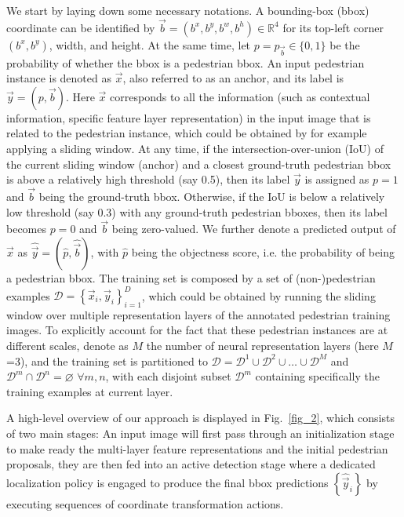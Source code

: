 \documentclass[10pt,journal,compsoc,twoside]{IEEEtran}
\begin{document}
We start by laying down some necessary notations.
A bounding-box (bbox) coordinate can be identified by $\vec{b}=(b^x,b^y,b^w,b^h) \in \mathbb{R}^4$ for its top-left corner $(b^x,b^y)$, width, and height.
At the same time, let $p=p_{\vec{b}} \in \{0, 1\}$ be the probability of whether the bbox is a pedestrian bbox.
An input pedestrian instance is denoted as $\vec{x}$, also referred to as an anchor, and its label is $\vec{y}=\left(p, \vec{b}\right)$.
Here $\vec{x}$ corresponds to all the information (such as contextual information, specific feature layer representation) in the input image that is related to the pedestrian instance,
which could be obtained by for example applying a sliding window. At any time,
if the intersection-over-union (IoU) of the current sliding window (anchor) and a closest ground-truth pedestrian bbox is above a relatively high threshold (say 0.5),
then its label $\vec{y}$ is assigned as $p=1$ and $\vec{b}$ being the ground-truth bbox.
Otherwise, if the IoU is below a relatively low threshold (say 0.3) with any ground-truth pedestrian bboxes,
then its label becomes $p=0$ and $\vec{b}$ being zero-valued.
We further denote a predicted output of $\vec{x}$ as $\hat{\vec{y}}=\left(\hat{p}, \hat{\vec{b}}\right)$, with $\hat{p}$ being the objectness score, i.e. the probability of being a pedestrian bbox.
The training set is composed by a set of (non-)pedestrian examples $\mathcal{D} = \left\{ \vec{x}_i, \vec{y}_i \right\}_{i=1}^D$,
which could be obtained by running the sliding window over multiple representation layers of the annotated pedestrian training images.
To explicitly account for the fact that these pedestrian instances are at different scales, denote as $M$ the number of neural representation layers (here $M$=3),
and the training set is partitioned to $\mathcal{D}= \mathcal{D}^1 \cup \mathcal{D}^2 \cup \ldots \cup \mathcal{D}^M$ and $\mathcal{D}^m \cap \mathcal{D}^n = \varnothing$  $\forall m, n$,
with each disjoint subset $\mathcal{D}^m$ containing specifically the training examples at current layer.

A high-level overview of our approach is displayed in Fig.~\ref{fig_2}, which consists of two main stages: An input image will first pass through an initialization stage to make ready the multi-layer feature representations and the initial pedestrian proposals, they are then fed into an active detection stage where a dedicated localization policy is engaged to produce the final bbox predictions $\left\{ \hat{\vec{y}}_i \right\}$ by executing sequences of coordinate transformation actions.
\end{document}
